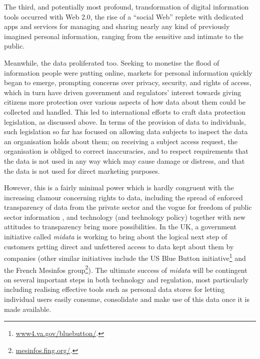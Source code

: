 \documentclass{acm_proc_article-sp}
\begin{document}


The third, and potentially most profound, transformation of digital information tools occurred with Web 2.0, the rise of a ``social Web'' replete with dedicated apps and services for managing and sharing nearly any kind of previously imagined personal information, ranging from the sensitive and intimate to the public.  

Meanwhile, the data proliferated too. Seeking to monetise the flood of information people were putting online, markets for personal information quickly began to emerge, prompting concerns over privacy, security, and rights of access, which in turn have driven government and regulators’ interest towards giving citizens more protection over various aspects of how data about them could be collected and handled.  This led to international efforts to craft data protection legislation, as discussed above.  In terms of the provision of data to individuals, such legislation so far has focused on allowing data subjects to inspect the data an organisation holds about them; on receiving a subject access request, the organisation is obliged to correct inaccuracies, and to respect requirements that the data is not used in any way which may cause damage or distress, and that the data is not used for direct marketing purposes.

However, this is a fairly minimal power which is hardly congruent with the increasing clamour concerning rights to data, including the spread of enforced transparency of data from the private sector \cite{fung2007} and the vogue for freedom of public sector information \cite{ohara2014}, and technology (and technology policy) together with new attitudes to transparency bring more possibilities. In the UK, a government initiative called \emph{midata} \cite{midata} is working to bring about the logical next step of customers getting direct and unfettered access to data kept about them by companies (other similar initiatives include the US Blue Button initiative\footnote{\url{www4.va.gov/bluebutton/}.} and the French Mesinfos group\footnote{\url{mesinfos.fing.org/}.}).  The ultimate success of \emph{midata} will be contingent on several important steps in both technology and regulation, most particularly including realising effective tools such as personal data stores for letting individual users easily consume, consolidate and make use of this data once it is made available.
\end{document}
